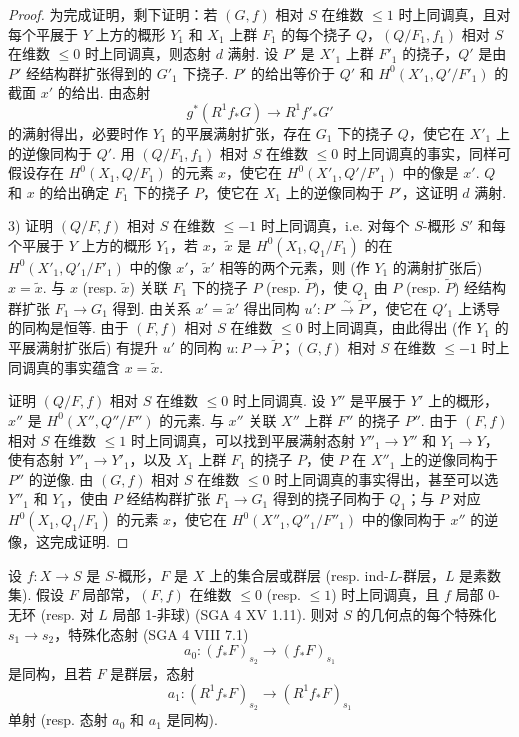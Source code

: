 \begin{proof}
为完成证明，剩下证明：若 $(G, f)$ 相对 $S$ 在维数 $\leqslant 1$ 时上同调真，且对每个平展于 $Y$ 上方的概形 $Y_1$ 和 $X_1$ 上群 $F_1$ 的每个挠子 $Q$，$(Q/F_1, f_1)$ 相对 $S$ 在维数 $\leqslant 0$ 时上同调真，则态射 $d$ 满射. 设 $P'$ 是 $X'_1$ 上群 $F'_1$ 的挠子，$Q'$ 是由 $P'$ 经结构群扩张得到的 $G'_1$ 下挠子. $P'$ 的给出等价于 $Q'$ 和 $H^0(X'_1, Q'/F'_1)$ 的截面 $x'$ 的给出. 由态射
\[
g^{*}(R^1 f_* G) \longrightarrow R^1 f'_* G'
\]
的满射得出，必要时作 $Y_1$ 的平展满射扩张，存在 $G_1$ 下的挠子 $Q$，使它在 $X'_1$ 上的逆像同构于 $Q'$. 用 $(Q/F_1, f_1)$ 相对 $S$ 在维数 $\leqslant 0$ 时上同调真的事实，同样可假设存在 $H^0(X_1, Q/F_1)$ 的元素 $x$，使它在 $H^0(X'_1, Q'/F'_1)$ 中的像是 $x'$. $Q$ 和 $x$ 的给出确定 $F_1$ 下的挠子 $P$，使它在 $X_1$ 上的逆像同构于 $P'$，这证明 $d$ 满射.

3) 证明 $(Q/F, f)$ 相对 $S$ 在维数 $\leqslant -1$ 时上同调真，i.e. 对每个 $S$-概形 $S'$ 和每个平展于 $Y$ 上方的概形 $Y_1$，若 $x$，$\widetilde{x}$ 是 $H^0(X_1, Q_1/F_1)$ 的在 $H^0(X'_1, Q'_1/F'_1)$ 中的像 $x'$，$\widetilde{x}'$ 相等的两个元素，则 (作 $Y_1$ 的满射扩张后) $x = \widetilde{x}$. 与 $x$ (resp. $\widetilde{x}$) 关联 $F_1$ 下的挠子 $P$ (resp. $\widetilde{P}$)，使 $Q_1$ 由 $P$ (resp. $\widetilde{P}$) 经结构群扩张 $F_1 \to G_1$ 得到. 由关系 $x' = \widetilde{x}'$ 得出同构 $u' \colon P' \xrightarrow{\sim} \widetilde{P}'$，使它在 $Q'_1$ 上诱导的同构是恒等. 由于 $(F, f)$ 相对 $S$ 在维数 $\leqslant 0$ 时上同调真，由此得出 (作 $Y_1$ 的平展满射扩张后) 有提升 $u'$ 的同构 $u \colon P \to \widetilde{P}$；$(G, f)$ 相对 $S$ 在维数 $\leqslant -1$ 时上同调真的事实蕴含 $x = \widetilde{x}$.

证明 $(Q/F, f)$ 相对 $S$ 在维数 $\leqslant 0$ 时上同调真. 设 $Y''$ 是平展于 $Y'$ 上的概形，$x''$ 是 $H^0(X'', Q''/F'')$ 的元素. 与 $x''$ 关联 $X''$ 上群 $F''$ 的挠子 $P''$. 由于 $(F, f)$ 相对 $S$ 在维数 $\leqslant 1$ 时上同调真，可以找到平展满射态射 $Y''_1 \to Y''$ 和 $Y_1 \to Y$，使有态射 $Y''_1 \to Y'_1$，以及 $X_1$ 上群 $F_1$ 的挠子 $P$，使 $P$ 在 $X''_1$ 上的逆像同构于 $P''$ 的逆像. 由 $(G, f)$ 相对 $S$ 在维数 $\leqslant 0$ 时上同调真的事实得出，甚至可以选 $Y''_1$ 和 $Y_1$，使由 $P$ 经结构群扩张 $F_1 \to G_1$ 得到的挠子同构于 $Q_1$；与 $P$ 对应 $H^0(X_1, Q_1/F_1)$ 的元素 $x$，使它在 $H^0(X''_1, Q''_1/F''_1)$ 中的像同构于 $x''$ 的逆像，这完成证明.
\end{proof}

\begin{proposition}\label{prop:XIII.1.14}
设 $f \colon X \to S$ 是 $S$-概形，$F$ 是 $X$ 上的集合层或群层 (resp. ind-$L$-群层，$L$ 是素数集). 假设 $F$ 局部常，$(F, f)$ 在维数 $\leqslant 0$ (resp. $\leqslant 1$) 时上同调真，且 $f$ 局部 0-无环 (resp. 对 $L$ 局部 1-非球) (SGA 4 XV 1.11). 则对 $S$ 的几何点的每个特殊化 $s_1 \to s_2$，特殊化态射 (SGA 4 VIII 7.1)
\[
a_0 \colon (f_* F)_{s_2} \longrightarrow (f_* F)_{s_1}
\]
是同构，且若 $F$ 是群层，态射
\[
a_1 \colon (R^1 f_* F)_{s_2} \longrightarrow (R^1 f_* F)_{s_1}
\]
单射 (resp. 态射 $a_0$ 和 $a_1$ 是同构).
\end{proposition}

